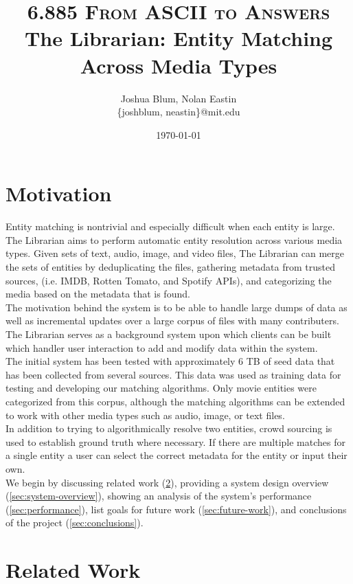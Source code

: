 \documentclass[paper=a4, fontsize=11pt]{scrartcl} %
\title{ 
\normalfont \normalsize 
\textsc{6.885 From ASCII to Answers} %
\horrule{0.5pt} %
\large The Librarian: Entity Matching Across Media Types %
\horrule{1pt} %
}
\author{Joshua Blum, Nolan Eastin \\ \{joshblum, neastin\}@mit.edu}
\date{\normalsize\today} %
\numberwithin{equation}{section} %
\numberwithin{figure}{section} %
\numberwithin{table}{section} %
\begin{document}
\maketitle %

\section{Motivation}
Entity matching is nontrivial and especially difficult when each entity is large. The Librarian aims to perform automatic entity resolution across various media types. Given sets of text, audio, image, and video files, The Librarian can merge the sets of entities by deduplicating the files, gathering metadata from trusted sources, (i.e. IMDB, Rotten Tomato, and Spotify APIs), and categorizing the media based on the metadata that is found. \\

The motivation behind the system is to be able to handle large dumps of data as well as incremental updates over a large corpus of files with many contributers. The Librarian serves as a background system upon which clients can be built which handler user interaction to add and modify data within the system.\\

The initial system has been tested with approximately 6 TB of seed data that has been collected from several sources. This data was used as training data for testing and developing our matching algorithms. Only movie entities were categorized from this corpus, although the matching algorithms can be extended to work with other media types such as audio, image, or text files. \\

In addition to trying to algorithmically resolve two entities, crowd sourcing is used to establish ground truth where necessary. If there are multiple matches for a single entity a user can select the correct metadata for the entity or input their own.\\

We begin by discussing related work (\ref{sec:related-work}), providing a system design overview (\ref{sec:system-overview}), showing an analysis of the system's performance (\ref{sec:performance}), list goals for future work (\ref{sec:future-work}), and conclusions of the project (\ref{sec:conclusions}).

\section{Related Work}
\label{sec:related-work}
\end{document}
